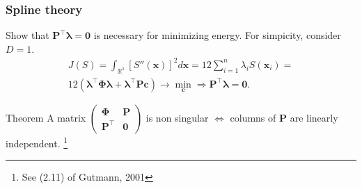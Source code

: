 \documentclass{beamer}
\begin{document}
\begin{frame}
\frametitle{Spline theory}
Show that $\mathbf{P}^\top\boldsymbol{\lambda} = \mathbf{0}$ is necessary for minimizing energy.
For simpicity, consider $D = 1$.
\begin{align*}
  J(S) = \int_{\mathbb{R}^1}[S''(\mathbf{x})]^2d\mathbf{x} = 12\sum_{i=1}^n\lambda_iS(\mathbf{x}_i)= \\
  12(\boldsymbol{\lambda}^\top\mathbf{\Phi}\boldsymbol{\lambda} + \boldsymbol{\lambda}^\top\mathbf{P}\mathbf{c})
  \to \min_{\mathbf{c}} \Rightarrow \mathbf{P}^\top\boldsymbol{\lambda} = \mathbf{0}.
\end{align*} 

\begin{alertblock}{Theorem}
  A matrix $\begin{pmatrix}\mathbf{\Phi} & \mathbf{P} \\ \mathbf{P}^\top & \mathbf{0}\end{pmatrix}$
  is non singular $\Leftrightarrow$ columns of $\mathbf{P}$ are linearly independent.
  \footnote{See (2.11) of Gutmann, 2001}
  
\end{alertblock}

\end{frame}
\end{document}
